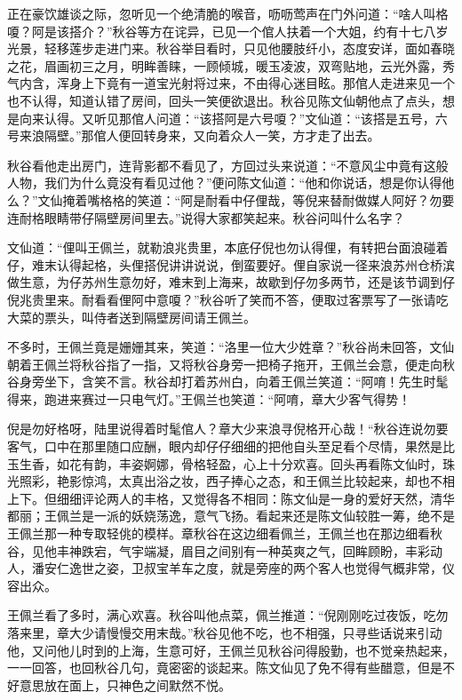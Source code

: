 \documentclass[12pt,UTF8]{ctexbook}
\begin{document}
{{{正在豪饮雄谈之际，忽听见一个绝清脆的喉音，呖呖莺声在门外问道：“啥人叫格嗄？阿是该搭介？”秋谷等方在诧异，已见一个倌人扶着一个大姐，约有十七八岁光景，轻移莲步走进门来。秋谷举目看时，只见他腰肢纤小，态度安详，面如春晓之花，眉画初三之月，明眸善睐，一顾倾城，暖玉凌波，双弯贴地，云光外露，秀气内含，浑身上下竟有一道宝光射将过来，不由得心迷目眩。那倌人走进来见一个也不认得，知道认错了房间，回头一笑便欲退出。秋谷见陈文仙朝他点了点头，想是向来认得。又听见那倌人问道：“该搭阿是六号嗄？”文仙道：“该搭是五号，六号来浪隔壁。”那倌人便回转身来，又向着众人一笑，方才走了出去。

秋谷看他走出房门，连背影都不看见了，方回过头来说道：“不意风尘中竟有这般人物，我们为什么竟没有看见过他？”便问陈文仙道：“他和你说话，想是你认得他么？”文仙掩着嘴格格的笑道：“阿是耐看中仔俚哉，等倪来替耐做媒人阿好？勿要连耐格眼睛带仔隔壁房间里去。”说得大家都笑起来。秋谷问叫什么名字？

文仙道：“俚叫王佩兰，就勒浪兆贵里，本底仔倪也勿认得俚，有转把台面浪碰着仔，难末认得起格，头俚搭倪讲讲说说，倒蛮要好。俚自家说一径来浪苏州仓桥滨做生意，为仔苏州生意勿好，难末到上海来，故歇到仔勿多两节，还是该节调到仔倪兆贵里来。耐看看俚阿中意嗄？”秋谷听了笑而不答，便取过客票写了一张请吃大菜的票头，叫侍者送到隔壁房间请王佩兰。

不多时，王佩兰竟是姗姗其来，笑道：“洛里一位大少姓章？”秋谷尚未回答，文仙朝着王佩兰将秋谷指了一指，又将秋谷身旁一把椅子拖开，王佩兰会意，便走向秋谷身旁坐下，含笑不言。秋谷却打着苏州白，向着王佩兰笑道：“阿唷！先生时髦得来，跑进来赛过一只电气灯。”王佩兰也笑道：“阿唷，章大少客气得势！

倪是勿好格呀，陆里说得着时髦倌人？章大少来浪寻倪格开心哉！“秋谷连说勿要客气，口中在那里随口应酬，眼内却仔仔细细的把他自头至足看个尽情，果然是比玉生香，如花有韵，丰姿婀娜，骨格轻盈，心上十分欢喜。回头再看陈文仙时，珠光照彩，艳影惊鸿，太真出浴之妆，西子捧心之态，和王佩兰比较起来，却也不相上下。但细细评论两人的丰格，又觉得各不相同：陈文仙是一身的爱好天然，清华都丽；王佩兰是一派的妖娆荡逸，意气飞扬。看起来还是陈文仙较胜一筹，绝不是王佩兰那一种专取轻佻的模样。章秋谷在这边细看佩兰，王佩兰也在那边细看秋谷，见他丰神跌宕，气宇端凝，眉目之间别有一种英爽之气，回眸顾盼，丰彩动人，潘安仁逸世之姿，卫叔宝羊车之度，就是旁座的两个客人也觉得气概非常，仪容出众。

王佩兰看了多时，满心欢喜。秋谷叫他点菜，佩兰推道：“倪刚刚吃过夜饭，吃勿落来里，章大少请慢慢交用末哉。”秋谷见他不吃，也不相强，只寻些话说来引动他，又问他儿时到的上海，生意可好，王佩兰见秋谷问得殷勤，也不觉亲热起来，一一回答，也回秋谷几句，竟密密的谈起来。陈文仙见了免不得有些醋意，但是不好意思放在面上，只神色之间默然不悦。

}}}
\end{document}
